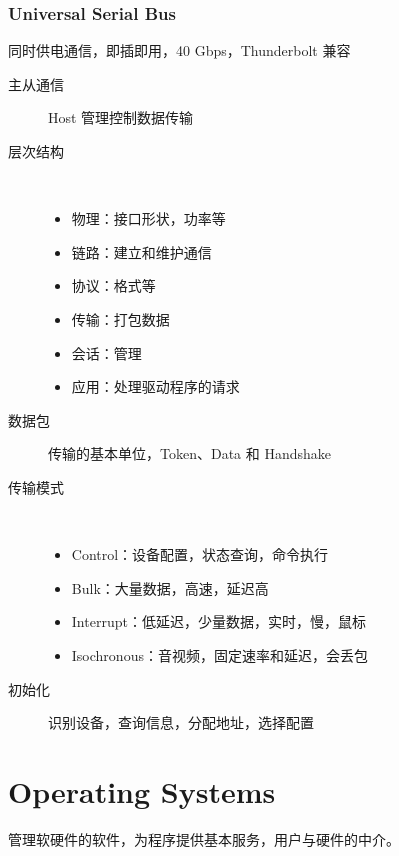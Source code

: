 \documentclass[11pt,journal,compsoc]{IEEEtran}
\begin{document}
\subsubsection{Universal Serial Bus}

同时供电通信，即插即用，40 Gbps，Thunderbolt 兼容

\begin{description}
    \item[主从通信] Host 管理控制数据传输

    \item[层次结构] ~
    
        \begin{itemize}
            \item 物理：接口形状，功率等
            \item 链路：建立和维护通信
            \item 协议：格式等
            \item 传输：打包数据
            \item 会话：管理
            \item 应用：处理驱动程序的请求
        \end{itemize}

    \item[数据包] 传输的基本单位，Token、Data 和 Handshake

    \item[传输模式] ~

        \begin{itemize}
            \item Control：设备配置，状态查询，命令执行

            \item Bulk：大量数据，高速，延迟高

            \item Interrupt：低延迟，少量数据，实时，慢，鼠标

            \item Isochronous：音视频，固定速率和延迟，会丢包
        \end{itemize}

    \item[初始化] 识别设备，查询信息，分配地址，选择配置
\end{description}


\section{Operating Systems}

管理软硬件的软件，为程序提供基本服务，用户与硬件的中介。
\end{document}
